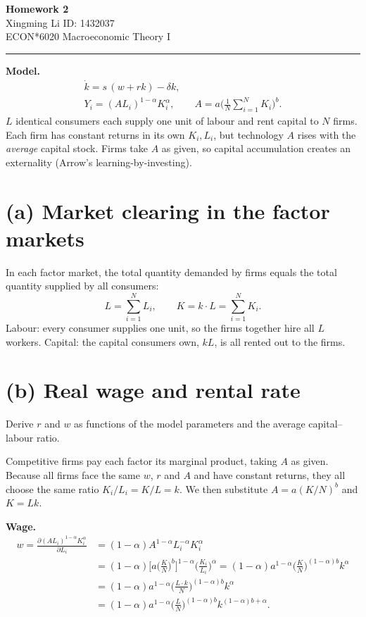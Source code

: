 \documentclass[11pt]{article}
\begin{document}
\begin{center}
{\Large\bfseries Homework 2}\\[0.35em]
{\small Xingming Li \quad ID: 1432037}\\[0.2em]
{\small ECON*6020 Macroeconomic Theory I}
\end{center}

\hrule
\medskip

\textbf{Model.}
\begin{gather*}
\dot k = s\,(w + rk) - \delta k, \\
Y_i = (AL_i)^{1-\alpha}K_i^{\alpha}, \qquad
A = a\Big(\frac{1}{N}\sum_{i=1}^{N} K_i\Big)^{b}.
\end{gather*}
$L$ identical consumers each supply one unit of labour and rent capital to $N$ firms. Each firm has
constant returns in its own $K_i, L_i$, but technology $A$ rises with the \emph{average} capital
stock. Firms take $A$ as given, so capital accumulation creates an externality
(Arrow's learning-by-investing).

\section*{(a) Market clearing in the factor markets}

In each factor market, the total quantity demanded by firms equals the total quantity supplied by all consumers:
\[
L = \sum_{i=1}^{N} L_i, \qquad K = k\cdot L = \sum_{i=1}^{N} K_i .
\]
Labour: every consumer supplies one unit, so the firms together hire all $L$ workers.
Capital: the capital consumers own, $kL$, is all rented out to the firms.

\section*{(b) Real wage and rental rate}

Derive $r$ and $w$ as functions of the model parameters and the average capital--labour ratio.

Competitive firms pay each factor its marginal product, taking $A$ as given. Because all firms face
the same $w$, $r$ and $A$ and have constant returns, they all choose the same ratio
$K_i/L_i = K/L = k$. We then substitute $A = a(K/N)^b$ and $K = Lk$.

\textbf{Wage.}
\begin{align*}
w = \frac{\partial (AL_i)^{1-\alpha}K_i^{\alpha}}{\partial L_i}
  &= (1-\alpha)A^{1-\alpha}L_i^{-\alpha}K_i^{\alpha} \\
  &= (1-\alpha)\Big[a\Big(\frac{K}{N}\Big)^{b}\Big]^{1-\alpha}\Big(\frac{K_i}{L_i}\Big)^{\alpha}
   = (1-\alpha)a^{1-\alpha}\Big(\frac{K}{N}\Big)^{(1-\alpha)b}k^{\alpha} \\
  &= (1-\alpha)a^{1-\alpha}\Big(\frac{L\cdot k}{N}\Big)^{(1-\alpha)b}k^{\alpha} \\
  &= (1-\alpha)a^{1-\alpha}\Big(\frac{L}{N}\Big)^{(1-\alpha)b}k^{(1-\alpha)b+\alpha}.
\end{align*}
\end{document}

